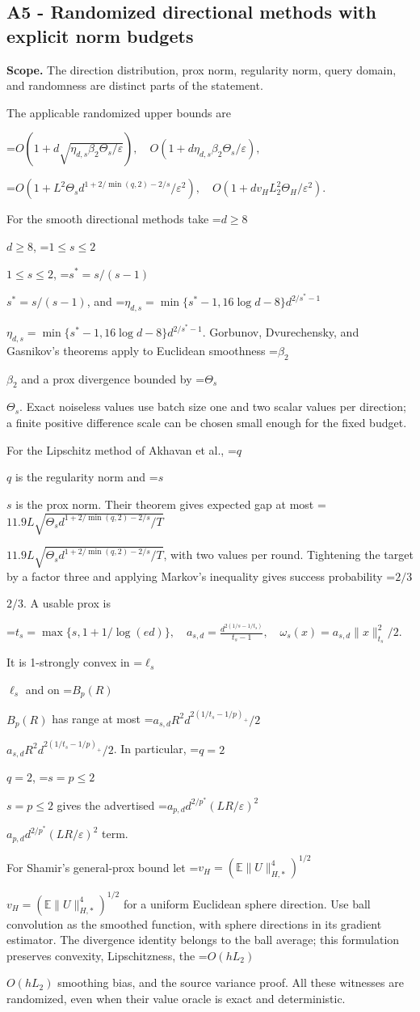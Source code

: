 \documentclass[10pt,a4paper]{article}
\newcommand{\AtlasMath}[1]{\par\begingroup\centering\setbox0=\hbox{$\displaystyle #1$}\ifdim\wd0>1.4\linewidth\typeout{ATLAS WIDE FORMULA: \the\wd0}\fi\ifdim\wd0>\linewidth\resizebox{\linewidth}{!}{\box0}\else\box0\fi\par\endgroup}
\newcommand{\AtlasInlineMath}[1]{\begingroup\setbox0=\hbox{$#1$}\ifdim\wd0>.4\linewidth\endgroup\AtlasMath{#1}\else\endgroup$#1$\fi}
\begin{document}
\subsection{A5 - Randomized directional methods with explicit norm budgets}
\textbf{Scope.} The direction distribution, prox norm, regularity norm, query domain, and randomness are distinct parts of the statement.

The applicable randomized upper bounds are

\AtlasMath{O(1+d\sqrt{\eta_{d,s}\beta_2\Theta_s/\varepsilon}),\quad O(1+d\eta_{d,s}\beta_2\Theta_s/\varepsilon),}


\AtlasMath{O(1+L^2\Theta_s d^{1+2/\min(q,2)-2/s}/\varepsilon^2),\quad O(1+dv_H L_2^2\Theta_H/\varepsilon^2).}


For the smooth directional methods take \AtlasInlineMath{d\ge8}, \AtlasInlineMath{1\le s\le2}, \AtlasInlineMath{s^*=s/(s-1)}, and \AtlasInlineMath{\eta_{d,s}=\min\{s^*-1,16\log d-8\}d^{2/s^*-1}}. Gorbunov, Dvurechensky, and Gasnikov's theorems apply to Euclidean smoothness \AtlasInlineMath{\beta_2} and a prox divergence bounded by \AtlasInlineMath{\Theta_s}. Exact noiseless values use batch size one and two scalar values per direction; a finite positive difference scale can be chosen small enough for the fixed budget.

For the Lipschitz method of Akhavan et al., \AtlasInlineMath{q} is the regularity norm and \AtlasInlineMath{s} is the prox norm. Their theorem gives expected gap at most \AtlasInlineMath{11.9L\sqrt{\Theta_s d^{1+2/\min(q,2)-2/s}/T}}, with two values per round. Tightening the target by a factor three and applying Markov's inequality gives success probability \AtlasInlineMath{2/3}. A usable prox is

\AtlasMath{t_s=\max\{s,1+1/\log(ed)\},\quad a_{s,d}=\frac{d^{2(1/s-1/t_s)}}{t_s-1},\quad\omega_s(x)=a_{s,d}\|x\|_{t_s}^2/2.}

It is 1-strongly convex in \AtlasInlineMath{\ell_s} and on \AtlasInlineMath{B_p(R)} has range at most \AtlasInlineMath{a_{s,d}R^2d^{2(1/t_s-1/p)_+}/2}. In particular, \AtlasInlineMath{q=2}, \AtlasInlineMath{s=p\le2} gives the advertised \AtlasInlineMath{a_{p,d}d^{2/p^*}(LR/\varepsilon)^2} term.

For Shamir's general-prox bound let \AtlasInlineMath{v_H=(\mathbb E\|U\|_{H,*}^4)^{1/2}} for a uniform Euclidean sphere direction. Use ball convolution as the smoothed function, with sphere directions in its gradient estimator. The divergence identity belongs to the ball average; this formulation preserves convexity, Lipschitzness, the \AtlasInlineMath{O(hL_2)} smoothing bias, and the source variance proof. All these witnesses are randomized, even when their value oracle is exact and deterministic.
\end{document}
